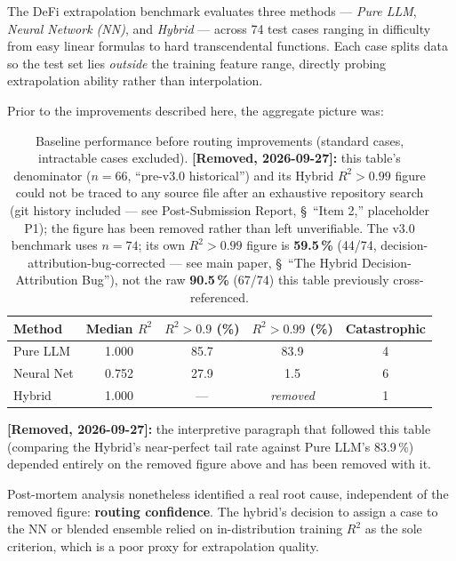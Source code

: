 \documentclass[twoside,11pt]{article}
\begin{document}
The DeFi extrapolation benchmark evaluates three methods --- \emph{Pure LLM},
\emph{Neural Network (NN)}, and \emph{Hybrid} --- across 74 test cases ranging
in difficulty from easy linear formulas to hard transcendental functions.
Each case splits data so the test set lies \emph{outside} the training feature
range, directly probing extrapolation ability rather than interpolation.

Prior to the improvements described here, the aggregate picture was:

\begin{table}[h]
\centering
\caption{Baseline performance before routing improvements (standard cases,
         intractable cases excluded). \textbf{[Removed, 2026-09-27]:} this
         table's denominator ($n{=}66$, ``pre-v3.0 historical'') and its
         Hybrid $R^2>0.99$ figure could not be traced to any source file
         after an exhaustive repository search (git history included --- see
         Post-Submission Report, \S~``Item 2,'' placeholder P1); the figure
         has been removed rather than left unverifiable. The v3.0 benchmark
         uses $n=74$; its own $R^2>0.99$ figure is \textbf{59.5\,\%} (44/74,
         decision-attribution-bug-corrected --- see main paper,
         \S~``The Hybrid Decision-Attribution Bug''), not the raw
         \textbf{90.5\,\%} (67/74) this table previously cross-referenced.}
\label{tab:baseline}
\begin{tabular}{lcccc}
\toprule
Method & Median $R^2$ & $R^2 > 0.9$ (\%) & $R^2 > 0.99$ (\%) & Catastrophic \\
\midrule
Pure LLM    & 1.000 & 85.7 & 83.9 & 4 \\
Neural Net  & 0.752 & 27.9 &  1.5 & 6 \\
Hybrid      & 1.000 & --- & \emph{removed} & 1 \\
\bottomrule
\end{tabular}
\end{table}

\textbf{[Removed, 2026-09-27]:} the interpretive paragraph that followed
this table (comparing the Hybrid's near-perfect tail rate against Pure
LLM's 83.9\,\%) depended entirely on the removed figure above and has been
removed with it.

Post-mortem analysis nonetheless identified a real root cause, independent
of the removed figure: \textbf{routing confidence}. The hybrid's decision
to assign a case to the NN or blended ensemble relied on in-distribution
training $R^2$ as the sole criterion, which is a poor proxy for
extrapolation quality.
\end{document}
